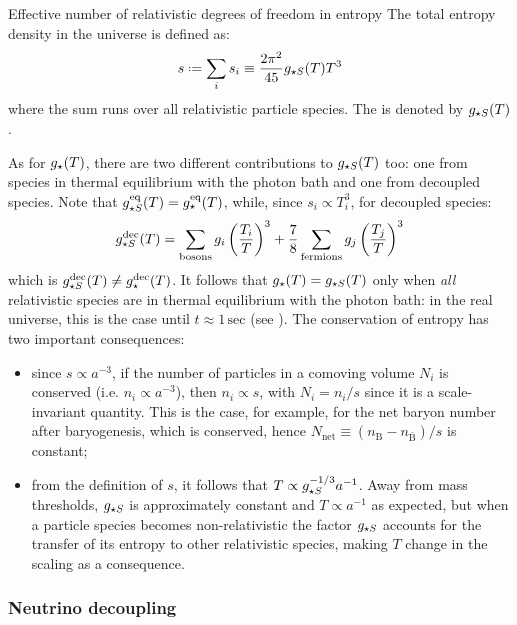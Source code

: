 \begin{definition}{Effective number of relativistic degrees of freedom in entropy}{}
  The total entropy density in the universe is defined as:
  \begin{equation}
    s \defeq \sum_i s_i \equiv \frac{2\pi^2}{45} \dofs(T) T^3
    \label{eq:s-def}
  \end{equation}
  where the sum runs over all relativistic particle species. The  is denoted by $ g_{\star S}(T) $.
\end{definition}

As for $ g_\star(T) $, there are two different contributions to $ g_{\star S}(T) $ too: one from species in thermal equilibrium with the photon bath and one from decoupled species. Note that $ g_{\star S}^\text{eq}(T) = g_\star^\text{eq}(T) $, while, since $ s_i \propto T_i^3 $, for decoupled species:
\begin{equation}
  g_{\star S}^\text{dec}(T) = \sum_\text{bosons} g_i \left( \frac{T_i}{T} \right)^3 + \frac{7}{8} \sum_\text{fermions} g_j \left( \frac{T_j}{T} \right)^3
\end{equation}
which is $ g_{\star S}^\text{dec}(T) \neq g_\star^\text{dec}(T) $. It follows that $ g_\star(T) = g_{\star S}(T) $ only when \emph{all} relativistic species are in thermal equilibrium with the photon bath: in the real universe, this is the case until $ t \approx 1 \,\text{sec} $ (see ).
The conservation of entropy has two important consequences:
\begin{itemize}
  \item since $ s \propto a^{-3} $, if the number of particles in a comoving volume $ N_i $ is conserved (i.e. $ n_i \propto a^{-3} $), then $ n_i \propto s $, with $ N_i = n_i / s $ since it is a scale-invariant quantity. This is the case, for example, for the net baryon number after baryogenesis, which is conserved, hence $ N_\text{net} \equiv (n_\text{B} - n_{\bar{\text{B}}}) / s $ is constant;
  \item from the definition of $ s $, it follows that $ T \propto g_{\star S}^{-1/3} a^{-1} $. Away from mass thresholds, $ g_{\star S} $ is approximately constant and $ T \propto a^{-1} $ as expected, but when a particle species becomes non-relativistic the factor $ g_{\star S} $ accounts for the transfer of its entropy to other relativistic species, making $ T $ change in the scaling as a consequence.
\end{itemize}

\subsubsection{Neutrino decoupling}

